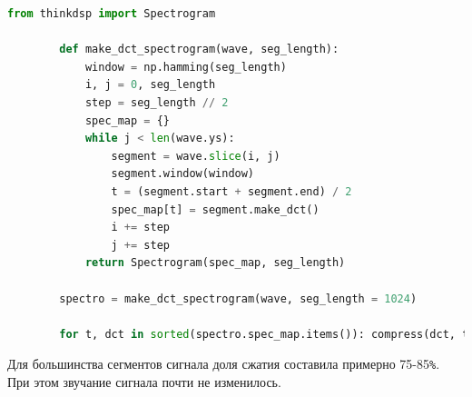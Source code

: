 \documentclass[a4paper, 12pt]{report}
\begin{document}
	\begin{lstlisting}[language=Python,caption=Применение функции для сжатия сигнала]
		from thinkdsp import Spectrogram

		def make_dct_spectrogram(wave, seg_length):
			window = np.hamming(seg_length)
			i, j = 0, seg_length
			step = seg_length // 2
			spec_map = {}
			while j < len(wave.ys):
				segment = wave.slice(i, j)
				segment.window(window)
				t = (segment.start + segment.end) / 2
				spec_map[t] = segment.make_dct()
				i += step
				j += step
			return Spectrogram(spec_map, seg_length)

		spectro = make_dct_spectrogram(wave, seg_length = 1024)

		for t, dct in sorted(spectro.spec_map.items()): compress(dct, thresh = 0.2)
	\end{lstlisting}
	Для большинства сегментов сигнала доля сжатия составила примерно 75-85\texttt{\%}. При этом звучание сигнала почти не изменилось.
\end{document}
